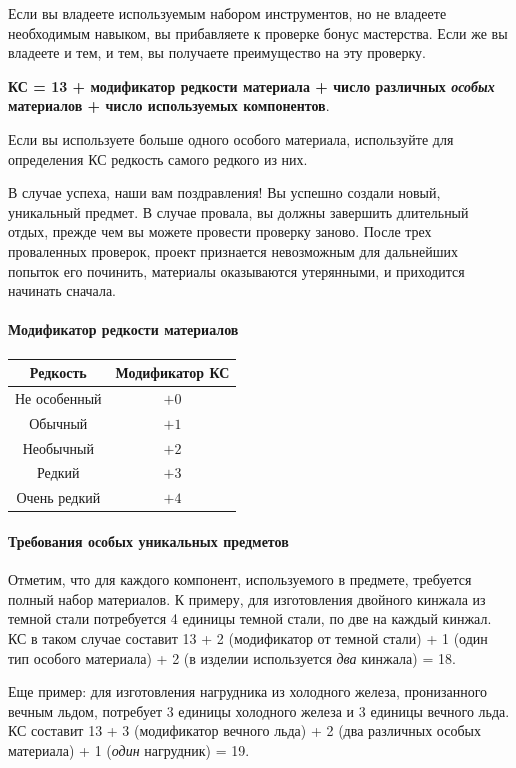 \documentclass[a4paper, 9pt, twocolumn]{book}
\begin{document}
	Если вы владеете используемым набором инструментов, но не владеете необходимым навыком, вы прибавляете к проверке бонус мастерства. Если же вы владеете и тем, и тем, вы получаете преимущество на эту проверку.
	
	\textbf{КС = 13 + модификатор редкости материала + число различных \textit{особых} материалов + число используемых компонентов}.
	
	Если вы используете больше одного особого материала, используйте для определения КС редкость самого редкого из них.
	
	В случае успеха, наши вам поздравления! Вы успешно создали новый, уникальный предмет. В случае провала, вы должны завершить длительный отдых, прежде чем вы можете провести проверку заново. После трех проваленных проверок, проект признается невозможным для дальнейших попыток его починить, материалы оказываются утерянными, и приходится начинать сначала.
	
	\paragraph*{Модификатор редкости материалов}
	
	\begin{tabular}{|c|c|}
		\hline
		\textbf{Редкость} & \textbf{Модификатор КС} \\
		\hline
		Не особенный & $+0$ \\
		\hline
		Обычный & $+1$ \\
		\hline
		Необычный & $+2$ \\
		\hline
		Редкий & $+3$ \\
		\hline
		Очень редкий & $+4$ \\
		\hline
	\end{tabular}
	
	\paragraph*{Требования особых уникальных предметов}
	
	Отметим, что для каждого компонент, используемого в предмете, требуется полный набор материалов. К примеру, для изготовления двойного кинжала из темной стали потребуется 4 единицы темной стали, по две на каждый кинжал. КС в таком случае составит 13 + 2 (модификатор от темной стали) + 1 (один тип особого материала) + 2 (в изделии используется \textit{два} кинжала) = 18.
	
	Еще пример: для изготовления нагрудника из холодного железа, пронизанного вечным льдом, потребует 3 единицы холодного железа и 3 единицы вечного льда. КС составит 13 + 3 (модификатор вечного льда) + 2 (два различных особых материала) + 1 (\textit{один} нагрудник) = 19.
	
\end{document}
